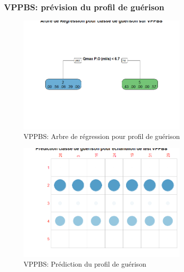 %
%

%

\subsubsection{VPPBS: prévision du profil de guérison}
\begin{figure}[H]
\centering
\includegraphics[width=0.75\textwidth]{../Fig/VPPBS/vppbs-regtree-healing-class.png}
\caption{VPPBS: Arbre de régression pour profil de guérison}
\label{fig-vppbs-regtree-ipss12}
\end{figure}

\begin{figure}[H]
\centering
\includegraphics[width=0.75\textwidth]{../Fig/VPPBS/vppbs-predict-healing-class.png}
\caption{VPPBS: Prédiction du profil de guérison}
\label{fig-vppbs-regtree-predict-ipss12}
\end{figure}

